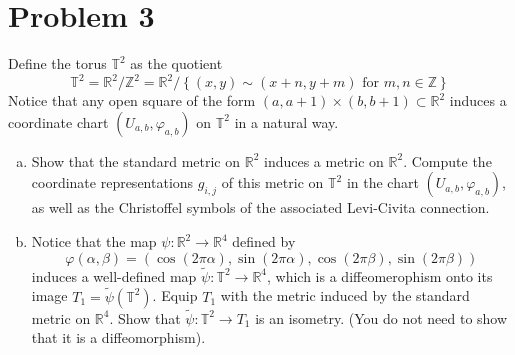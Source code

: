 \documentclass[a4paper]{article}
\begin{document}
\section*{Problem 3}%

Define the torus $\mathds{T}^2$ as the quotient
\[
  \mathds{T}^2 = \mathds{R}^2 / \mathds{Z}^2 = \mathds{R}^2 / \left\{ (x,y) \sim (x+n, y+m)\text{ for } m,n \in \mathds{Z} \right\}
\]
Notice that any open square of the form $(a, a+1) \times (b, b+1) \subset \mathds{R}^2$ induces a coordinate chart $(U_{a,b}, \varphi_{a,b})$ on $\mathds{T}^2$ in a natural way.

\begin{enumerate}[(a)]
  \item Show that the standard metric on $\mathds{R}^2$ induces a metric on $\mathds{R}^2$. Compute the coordinate representations $g_{i,j}$ of this metric on $\mathds{T}^2$ in the chart $(U_{a,b}, \varphi_{a,b})$, as well as the Christoffel symbols of the associated Levi-Civita connection.
  \item Notice that the map $\psi: \mathds{R}^2 \rightarrow \mathds{R}^4$ defined by 
    \[
      \varphi(\alpha,\beta) = (\cos(2\pi\alpha), \sin(2\pi\alpha), \cos(2\pi \beta), \sin(2\pi\beta))
    \]
    induces a well-defined map $\tilde{\psi}: \mathds{T}^2 \rightarrow \mathds{R}^4$, which is a diffeomerophism onto its image $T_1 = \tilde{\psi}(\mathds{T}^2)$. Equip $T_1$ with the metric induced by the standard metric on $\mathds{R}^4$. Show that $\tilde{\psi}: \mathds{T}^2 \rightarrow T_1$ is an isometry. (You do not need to show that it is a diffeomorphism).
\end{enumerate}
\end{document}
